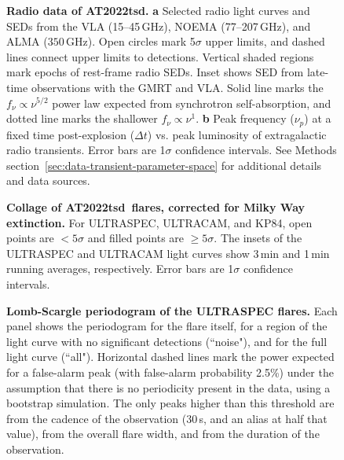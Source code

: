 \documentclass{nature_plusfigure}
\newcommand{\at}{AT2022tsd}
\begin{document}
\begin{extended_data}
\begin{figure}[!ht]
 \centering
  \caption{\textbf{Radio data of \at.} \textbf{a} Selected radio light curves and SEDs from the VLA (15--45\,GHz), NOEMA (77--207\,GHz), and ALMA ($350$\,GHz). Open circles mark 5$\sigma$ upper limits, and dashed lines connect upper limits to detections. Vertical shaded regions mark epochs of rest-frame radio SEDs. Inset shows SED from late-time observations with the GMRT and VLA. Solid line marks the $f_\nu \propto \nu^{5/2}$ power law expected from synchrotron self-absorption, and dotted line marks the shallower $f_\nu \propto \nu^{1}$. \textbf{b} Peak frequency ($\nu_p$) at a fixed time post-explosion ($\Delta t$) vs. peak luminosity of extragalactic radio transients. Error bars are 1$\sigma$ confidence intervals. See Methods section~\ref{sec:data-transient-parameter-space} for additional details and data sources.}
 \label{fig:radio}
\end{figure}

\begin{figure}[ht]
 \centering
  \caption{\textbf{Collage of \at\ flares, corrected for Milky Way extinction.} For ULTRASPEC, ULTRACAM, and KP84, open points are $<5\sigma$ and filled points are $\geq5\sigma$. The insets of the ULTRASPEC and ULTRACAM light curves show 3\,min and 1\,min running averages, respectively. Error bars are 1$\sigma$ confidence intervals.
}
 \label{fig:flare-collage}
\end{figure}

\begin{figure*}[ht]
    \centering
    \caption{\textbf{Lomb-Scargle periodogram of the ULTRASPEC flares.} Each panel shows the periodogram for the flare itself, for a region of the light curve with no significant detections (``noise"), and for the full light curve (``all"). Horizontal dashed lines mark the power expected for a false-alarm peak (with false-alarm probability 2.5\%) under the assumption that there is no periodicity present in the data, using a bootstrap simulation. The only peaks higher than this threshold are from the cadence of the observation (30\,s, and an alias at half that value), from the overall flare width, and from the duration of the observation.}
    \label{fig:ultraspec-periodogram}
\end{figure*}


\end{extended_data}
\end{document}
